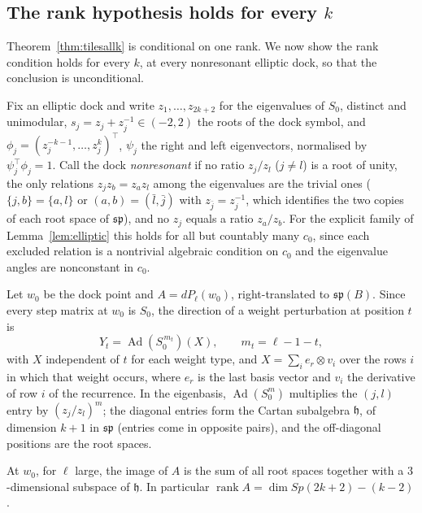 \subsection*{The rank hypothesis holds for every $k$}
\label{sec:tilesrank}

Theorem~\ref{thm:tilesallk} is conditional on one rank. We now show the rank
condition holds for every $k$, at every nonresonant elliptic dock, so that
the conclusion is unconditional.

Fix an elliptic dock and write $z_1,\dots,z_{2k+2}$ for the eigenvalues of
$S_0$, distinct and unimodular, $s_j=z_j+z_j^{-1}\in(-2,2)$ the roots of the
dock symbol, and $\phi_j=(z_j^{-k-1},\dots,z_j^{k})^{\!\top}$,
$\psi_j$ the right and left eigenvectors, normalised by $\psi_j^{\!\top}\phi_j=1$.
Call the dock \emph{nonresonant} if no ratio $z_j/z_l$ ($j\ne l$) is a root of
unity, the only relations $z_jz_b=z_az_l$ among the eigenvalues are the
trivial ones ($\{j,b\}=\{a,l\}$ or $(a,b)=(\bar l,\bar j)$ with $z_{\bar j}=z_j^{-1}$,
which identifies the two copies of each root space of $\mathfrak{sp}$), and no
$z_j$ equals a ratio $z_a/z_b$. For the explicit family of Lemma~\ref{lem:elliptic} this
holds for all but countably many $c_0$, since each excluded relation is a
nontrivial algebraic condition on $c_0$ and the eigenvalue angles are
nonconstant in $c_0$.

Let $w_0$ be the dock point and $A=dP_\ell(w_0)$, right-translated to
$\mathfrak{sp}(B)$. Since every step matrix at $w_0$ is $S_0$, the direction of
a weight perturbation at position $t$ is
\[
  Y_t=\operatorname{Ad}(S_0^{\,m_t})(X),\qquad m_t=\ell-1-t,
\]
with $X$ independent of $t$ for each weight type, and $X=\sum_i e_r\otimes v_i$
over the rows $i$ in which that weight occurs, where $e_r$ is the last basis
vector and $v_i$ the derivative of row $i$ of the recurrence. In the eigenbasis,
$\operatorname{Ad}(S_0^{m})$ multiplies the $(j,l)$ entry by $(z_j/z_l)^{m}$; the
diagonal entries form the Cartan subalgebra $\mathfrak h$, of dimension $k+1$
in $\mathfrak{sp}$ (entries come in opposite pairs), and the off-diagonal
positions are the root spaces.

\begin{lemma}\label{lem:firstorder}
At $w_0$, for $\ell$ large, the image of $A$ is the sum of all root spaces
together with a $3$-dimensional subspace of $\mathfrak h$. In particular
$\operatorname{rank}A=\dim Sp(2k+2)-(k-2)$.
\end{lemma}

